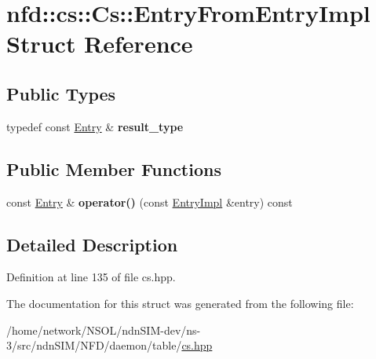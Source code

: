 \hypertarget{structnfd_1_1cs_1_1Cs_1_1EntryFromEntryImpl}{}\section{nfd\+:\+:cs\+:\+:Cs\+:\+:Entry\+From\+Entry\+Impl Struct Reference}
\label{structnfd_1_1cs_1_1Cs_1_1EntryFromEntryImpl}
\subsection*{Public Types}
\begin{DoxyCompactItemize}
\item 
typedef const \hyperlink{classnfd_1_1cs_1_1Entry}{Entry} \& {\bfseries result\+\_\+type}\hypertarget{structnfd_1_1cs_1_1Cs_1_1EntryFromEntryImpl_a0738c7fbc871d6ba4c53a46ec8ce6efb}{}\label{structnfd_1_1cs_1_1Cs_1_1EntryFromEntryImpl_a0738c7fbc871d6ba4c53a46ec8ce6efb}

\end{DoxyCompactItemize}
\subsection*{Public Member Functions}
\begin{DoxyCompactItemize}
\item 
const \hyperlink{classnfd_1_1cs_1_1Entry}{Entry} \& {\bfseries operator()} (const \hyperlink{classnfd_1_1cs_1_1EntryImpl}{Entry\+Impl} \&entry) const\hypertarget{structnfd_1_1cs_1_1Cs_1_1EntryFromEntryImpl_a28134b90ee8f83cd8d9c5aa574d72aed}{}\label{structnfd_1_1cs_1_1Cs_1_1EntryFromEntryImpl_a28134b90ee8f83cd8d9c5aa574d72aed}

\end{DoxyCompactItemize}


\subsection{Detailed Description}


Definition at line 135 of file cs.\+hpp.



The documentation for this struct was generated from the following file\+:\begin{DoxyCompactItemize}
\item 
/home/network/\+N\+S\+O\+L/ndn\+S\+I\+M-\/dev/ns-\/3/src/ndn\+S\+I\+M/\+N\+F\+D/daemon/table/\hyperlink{cs_8hpp}{cs.\+hpp}\end{DoxyCompactItemize}
